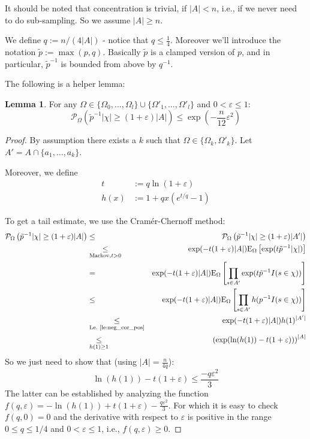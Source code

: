 \documentclass{article}
\newcommand{\prob}{\mathcal P}
\newcommand{\expectation}{\mathrm{E}}
\newcommand{\eps}{\varepsilon}
\theoremstyle{definition}
\newtheorem{lemma}{Lemma}
\begin{document}
It should be noted that concentration is trivial, if $|A| < n$, i.e., if we never need to do sub-sampling.
So we assume $|A| \geq n$.

We define $q := n/(4|A|)$ - notice that $q \leq \frac{1}{4}$. Moreover we'll introduce the notation $\tilde{p} := \max(p,q)$.
Basically $\tilde{p}$ is a clamped version of $p$, and in particular, $\tilde{p}^{-1}$ is bounded from above by $q^{-1}$.

The following is a helper lemma:
\begin{lemma}
\label{le:helper}
For any $\Omega \in \{\Omega_0,\ldots,\Omega_l\} \cup \{\Omega'_1,\ldots,\Omega'_l\}$ and $0 < \eps \leq 1$:
\[
\prob_{\Omega} \left( \tilde{p}^{-1} |\chi| \geq (1+\eps) |A| \right) \leq \exp\left(-\frac{n}{12} \eps^2\right)
\]
\end{lemma}
\begin{proof}
By assumption there exists a $k$ such that $\Omega \in \{\Omega_k, \Omega'_k\}$. Let $A' = A \cap \{a_1,\ldots,a_k\}$.

Moreover, we define
\begin{align*}
  t & := q \ln( 1 + \eps) \\
  h(x) & := 1+qx(e^{t/q}-1)  
\end{align*}

To get a tail estimate, we use the Cram\'{e}r-Chernoff method:
{\allowdisplaybreaks
\begin{eqnarray*}
  \prob_{\Omega} \left( \tilde{p}^{-1} |\chi| \geq (1+\eps) |A| \right) & \leq & \prob_{\Omega} \left( \tilde{p}^{-1} |\chi| \geq (1+\eps) |A'| \right) \\
  & \underset{\textrm{Markov,}t>0}{\leq} & \exp( -t (1+\eps) |A| ) \expectation_\Omega \left[ \exp ( t \tilde{p}^{-1} |\chi| ) \right] \\
 & = & \exp( -t (1+\eps) |A| ) \expectation_\Omega \left[ \prod_{s \in A'} \exp ( t \tilde{p}^{-1} I(s \in \chi) ) \right] \\
 & \leq & \exp( -t (1+\eps) |A| ) \expectation_\Omega \left[ \prod_{s \in A'} h( p^{-1} I(s \in \chi) ) \right] \\
 & \underset{\textrm{Le.~\ref{le:neg_cor_pos}}}{\leq} & \exp( -t (1+\eps) |A| ) h(1)^{|A'|} \\
 & \underset{h(1)\geq 1}{\leq} & \left(\exp( \ln(h(1)) -t (1+\eps))\right) ^ {|A|} 
\end{eqnarray*}}
So we just need to show that (using $|A|=\frac{n}{4q}$):
\[
  \ln(h(1))-t (1+\eps) \leq \frac{-q \eps^2}{3}
\]
The latter can be established by analyzing the function $f(q,\eps) = -\ln (h(1)) +t (1+\eps) - \frac{q\eps^2}{3}$.
For which it is easy to check $f(q,0) = 0$ and the derivative with respect to $\eps$ is positive in the range $0 \leq q \leq 1/4$ and $0 < \eps \leq 1$, i.e.,
$f(q,\eps) \geq 0$.
\end{proof}
\end{document}
